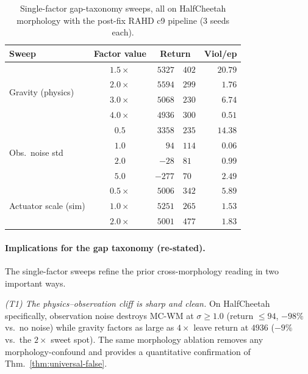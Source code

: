 \documentclass{article}
\theoremstyle{definition}
\begin{document}
\begin{table}[h]
\caption{Single-factor gap-taxonomy sweeps, all on HalfCheetah morphology
with the post-fix RAHD c9 pipeline (3 seeds each).}
\label{tab:taxonomy-sweeps}
\centering
\small
\begin{tabular}{lcr@{$\,\pm\,$}lr}
\toprule
Sweep & Factor value & \multicolumn{2}{c}{Return} & Viol/ep \\
\midrule
\multirow{4}{*}{Gravity (physics)}    & $1.5\times$ & $5327$ & $402$ & $20.79$ \\
                                      & $2.0\times$ & $5594$ & $299$ & $1.76$  \\
                                      & $3.0\times$ & $5068$ & $230$ & $6.74$  \\
                                      & $4.0\times$ & $4936$ & $300$ & $0.51$  \\
\midrule
\multirow{4}{*}{Obs.\ noise std}      & $0.5$       & $3358$ & $235$ & $14.38$ \\
                                      & $1.0$       & $94$   & $114$ & $0.06$  \\
                                      & $2.0$       & $-28$  & $81$  & $0.99$  \\
                                      & $5.0$       & $-277$ & $70$  & $2.49$  \\
\midrule
\multirow{3}{*}{Actuator scale (sim)} & $0.5\times$ & $5006$ & $342$ & $5.89$  \\
                                      & $1.0\times$ & $5251$ & $265$ & $1.53$  \\
                                      & $2.0\times$ & $5001$ & $477$ & $1.83$  \\
\bottomrule
\end{tabular}
\end{table}

\paragraph{Implications for the gap taxonomy (re-stated).}
The single-factor sweeps refine the prior cross-morphology reading in
two important ways.

\emph{(T1) The physics--observation cliff is sharp and clean.}  On
HalfCheetah specifically, observation noise destroys MC-WM at
$\sigma\!\ge\!1.0$ (return $\le 94$, $-98\%$ vs.\ no noise) while
gravity factors as large as $4\times$ leave return at $4936$
($-9\%$ vs.\ the $2\times$ sweet spot).  The same morphology ablation
removes any morphology-confound and provides a quantitative
confirmation of Thm.~\ref{thm:universal-false}.
\end{document}
